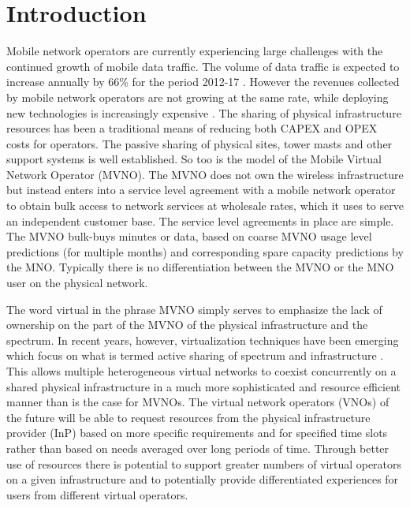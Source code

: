 \documentclass[conference]{IEEEtran}
\begin{document}
\section{Introduction}
Mobile network operators are currently experiencing large challenges with the continued growth of mobile data traffic. The volume of data traffic is expected to increase annually by 66\% for the period 2012-17 \cite{Cisco2013}. However the revenues collected by mobile network operators are not growing at the same rate, while deploying new technologies is increasingly expensive \cite{NEC2013}. The sharing of physical infrastructure resources has been a traditional means of reducing both CAPEX and OPEX costs for operators. The passive sharing of physical sites, tower masts and other support systems is well established. So too is the model of the Mobile Virtual Network Operator (MVNO). The MVNO does not own the wireless infrastructure but instead enters into a service level agreement with a mobile network operator to obtain bulk access to network services at wholesale rates, which it uses to serve an independent customer base. The service level agreements in place are simple. The MVNO bulk-buys minutes or data, based on coarse MVNO usage level predictions (for multiple months) and corresponding spare capacity predictions by the MNO.  Typically there is no differentiation between the MVNO or the MNO user on the physical network.





The word virtual in the phrase MVNO simply serves to emphasize the lack of ownership on the part of the MVNO of the physical infrastructure and the spectrum. In recent years, however, virtualization techniques have been emerging which focus on what is termed active sharing of spectrum and infrastructure \cite{Costa2013}. This allows multiple heterogeneous virtual networks to coexist concurrently on a shared physical infrastructure in a much more sophisticated and resource efficient manner than is the case for MVNOs. The virtual network operators (VNOs) of the future will be able to request resources from the physical infrastructure provider (InP) based on more specific requirements and for specified time slots rather than based on needs averaged over long periods of time. Through better use of resources there is potential to support greater numbers of virtual operators on a given infrastructure and to potentially provide differentiated experiences for users from different virtual operators.
\end{document}
